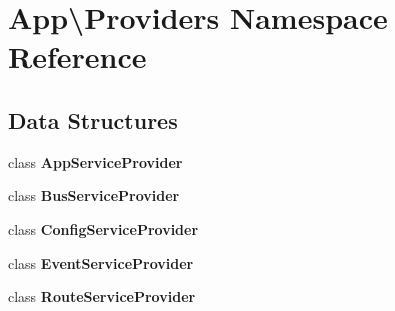 \section{App\textbackslash{}Providers Namespace Reference}
\label{namespace_app_1_1_providers}
\subsection*{Data Structures}
\begin{DoxyCompactItemize}
\item 
class {\bf App\+Service\+Provider}
\item 
class {\bf Bus\+Service\+Provider}
\item 
class {\bf Config\+Service\+Provider}
\item 
class {\bf Event\+Service\+Provider}
\item 
class {\bf Route\+Service\+Provider}
\end{DoxyCompactItemize}
